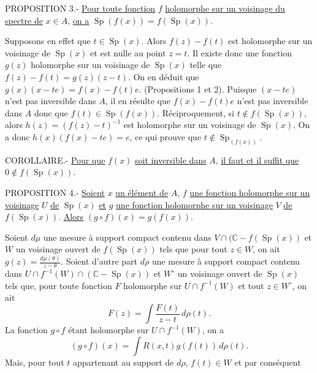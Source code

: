 
PROPOSITION 3.- \uline{Pour toute fonction} $f$ \uline{holomorphe sur un voisinage du spectre de} $x\in A$, \uline{on a} $\operatorname{Sp}(f(x))=f(\operatorname{Sp}(x))$.

Supposons en effet que $t\in\operatorname{Sp}(x)$. Alors $f(z)-f(t)$ est holomorphe sur un voisinage de $\operatorname{Sp}(x)$ et est nulle au point $z=t$. Il existe donc une fonction $g(z)$ holomorphe sur un voisinage de $\operatorname{Sp}(x)$ telle que $f(z)-f(t)=g(z)(z-t)$. On en déduit que $g(x)(x-te)=f(x)-f(t)e$. (Propositions 1 et 2). Puisque $(x-te)$ n'est pas inversible dans $A$, il en résulte que $f(x)-f(t)e$ n'est pas inversible dans $A$ donc que $f(t)\in\operatorname{Sp}(f(x))$. Réciproquement, si $t\notin f(\operatorname{Sp}(x))$, alors $h(z)=(f(z)-t)^{-1}$ est holomorphe sur un voisinage de $\operatorname{Sp}(x)$. On a donc $h(x)(f(x)-te)=e$, ce qui prouve que $t\notin\operatorname{Sp}_{(f(x))}$.

COROLLAIRE.- \uline{Pour que} $f(x)$ \uline{soit inversible dans} $A$, \uline{il faut et il suffit que} $0\notin f(\operatorname{Sp}(x))$.

PROPOSITION 4.- \uline{Soient} $x$ \uline{un élément de} $A$, $f$ \uline{une fonction holomorphe sur un voisinage} $U$ \uline{de} $\operatorname{Sp}(x)$ \uline{et} $g$ \uline{une fonction holomorphe sur un voisinage} $V$ \uline{de} $f(\operatorname{Sp}(x))$. \uline{Alors} $(g\circ f)(x)=g(f(x))$.

Soient $d\mu$ une mesure à support compact contenu dans $V\cap(\mathbb C-f(\operatorname{Sp}(x))$ et $W$ un voisinage ouvert de $f(\operatorname{Sp}(x))$ tels que pour tout $z\in W$, on ait $g(z)=\frac{d\mu(\theta)}{z-\theta}$. Soient d'autre part $d\rho$ une mesure à support compact contenu dans $U\cap f^{-1}(W)\cap(\mathbb C-\operatorname{Sp}(x))$ et $W^\circ$ un voisinage ouvert de $\operatorname{Sp}(x)$ tels que, pour toute fonction $F$ holomorphe sur $U\cap f^{-1}(W)$ et tout $z\in W^\circ$, on ait
\[
F(z)=\int\frac{F(t)}{z-t}\,d\rho(t).
\]
La fonction $g\circ f$ étant holomorphe sur $U\cap f^{-1}(W)$, on a
\[
(g\circ f)(x)=\int R(x,t)g(f(t))\,d\rho(t).
\]
Mais, pour tout $t$ appartenant au support de $d\rho$, $f(t)\in W$ et par conséquent

